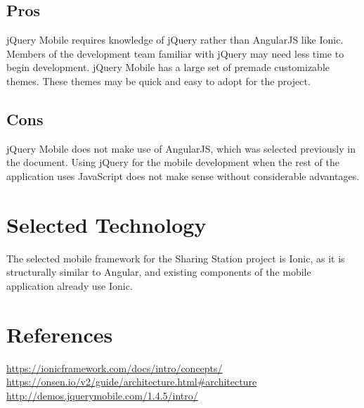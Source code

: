 \documentclass[letterpaper,10pt,draftclsnofoot,onecolumn]{IEEEtran}
\begin{document}
\subsection*{Pros}
jQuery Mobile requires knowledge of jQuery rather than AngularJS like Ionic. Members of the development team familiar with jQuery may need less time to begin development.
jQuery Mobile has a large set of premade customizable themes. These themes may be quick and easy to adopt for the project.
\subsection*{Cons}
 jQuery Mobile does not make use of AngularJS, which was selected previously in the document. Using jQuery for the mobile development when the rest of the application uses JavaScript does not make sense without considerable advantages.
 \section*{Selected Technology}
 The selected mobile framework for the Sharing Station project is Ionic, as it is structurally similar to Angular, and existing components of the mobile application already use Ionic.
\section*{References}
\url{https://ionicframework.com/docs/intro/concepts/}\newline
\url{https://onsen.io/v2/guide/architecture.html#architecture}\newline
\url{http://demos.jquerymobile.com/1.4.5/intro/}\newline




\end{document}

